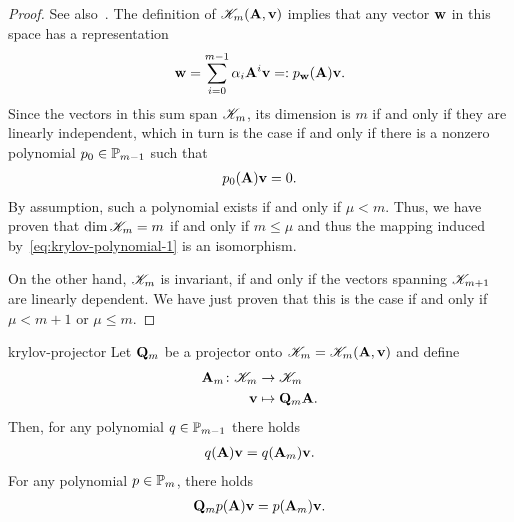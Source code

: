 \begin{proof}
  See also~\cite[Propositions 6.1 \& 6.2]{Saad00}.
  The definition of $\krylov_m(\mata,\vv)$ implies that any vector $\vw$ in this space has a representation
  \begin{gather}
    \vw = \sum_{i=0}^{m-1} \alpha_i \mata^i\vv =: p_{\vw}(\mata) \vv.
  \end{gather}
  Since the vectors in this sum span $\krylov_m$, its dimension is
  $m$ if and only if they are linearly independent, which in turn is
  the case if and only if there is a nonzero polynomial
  $p_0\in\P_{m-1}$ such that
  \begin{gather}
    p_0(\mata)\vv = 0.
  \end{gather}
  By assumption, such a polynomial exists if and only if
  $\mu<m$. Thus, we have proven that $\dim \krylov_m = m$ if and only
  if $m\le \mu$ and thus the mapping induced
  by~\eqref{eq:krylov-polynomial-1} is an isomorphism.

  On the other hand, $\krylov_m$ is invariant, if and only if the
  vectors spanning $\krylov_{m+1}$ are linearly dependent. We have
  just proven that this is the case if and only if $\mu<m+1$ or
  $\mu\le m$.
\end{proof}

\begin{Lemma}{krylov-projector}
  Let $\matq_m$ be a projector onto $\krylov_m=\krylov_m(\mata,\vv)$ and define
  \begin{align}
    \mata_m\colon \krylov_m &\to \krylov_m\\
    \vv&\mapsto \matq_m \mata.
  \end{align}
  Then, for any polynomial $q\in\P_{m-1}$ there holds
  \begin{gather}
    \label{eq:krylov-projector-1}
    q(\mata)\vv = q(\mata_m)\vv.
  \end{gather}
  For any polynomial $p\in\P_m$, there holds
  \begin{gather}
    \label{eq:krylov-projector-2}
    \matq_m p(\mata)\vv = p(\mata_m)\vv.
  \end{gather}
\end{Lemma}

